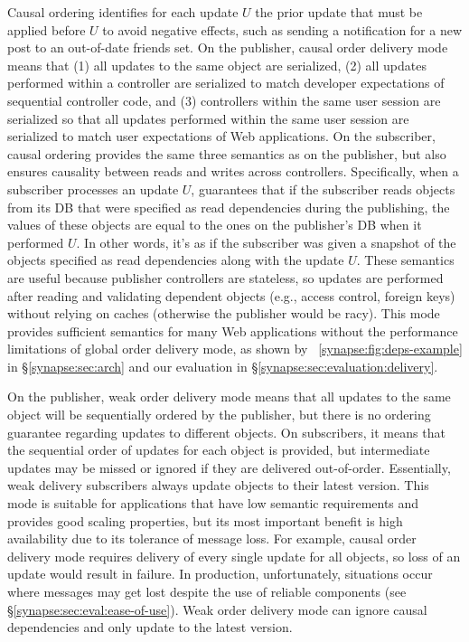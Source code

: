 Causal ordering identifies for each update $U$ the prior update that
must be applied before $U$ to avoid negative effects, such as sending a
notification for a new post to an out-of-date friends set.
On the publisher, causal order delivery mode means that (1) all 
updates to the same object are serialized, (2) all updates performed
within a controller are serialized to match developer expectations of
sequential controller code, and (3) controllers within the same
user session are serialized so that all updates performed within the
same user session are serialized to match user expectations of Web
applications.
On the subscriber, causal ordering provides the same three semantics as on the
publisher, but also ensures causality between
reads and writes across controllers. 
Specifically, when a subscriber processes an update $U$, \synapse guarantees
that if the subscriber reads objects from its DB that were specified as read dependencies
during the publishing, the values of these objects are equal
to the ones on the publisher's DB when it performed $U$.
In other words, it's as if the subscriber was given a snapshot of the objects
specified as read dependencies along with the update $U$.
These semantics are useful because publisher controllers are stateless, so
updates are performed after reading and validating dependent objects (e.g.,
access control, foreign keys) without relying on caches (otherwise the publisher
would be racy).
This mode provides sufficient semantics for many Web applications
without the performance limitations of global order delivery mode, as shown by 
\F~\ref{synapse:fig:deps-example} in \S\ref{synapse:sec:arch} and our evaluation
in \S\ref{synapse:sec:evaluation:delivery}. 


On the publisher, weak order delivery mode means that all updates to the
same object will be sequentially ordered by the publisher, but there
is no ordering guarantee regarding updates to different objects.  On
subscribers, it means that the sequential order of updates for each 
object is provided, but intermediate updates may be
missed or ignored if they are delivered out-of-order.  Essentially,
weak delivery subscribers always update objects to their
latest version.  
This mode is suitable for applications that have low semantic
requirements and provides good scaling properties, but its
most important benefit is high availability due to its tolerance of
message loss.  For example, causal order delivery mode 
requires delivery of every single update for all objects, so loss
of an update would result in failure.  In production, unfortunately,
situations occur where messages may get lost despite the use of
reliable components (see \S\ref{synapse:sec:eval:ease-of-use}).  Weak
order delivery mode can ignore causal dependencies and only update
to the latest version.

